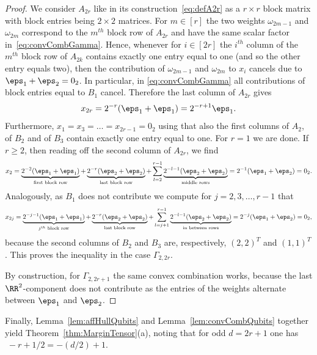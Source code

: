 \begin{proof}
We consider $A_{2r}$ like in its construction~\eqref{eq:defA2r} as a $r \times r$ block matrix with block entries being $2 \times 2$ matrices. For $m \in [r]$ the two weights $\omega_{2m-1}$ and $\omega_{2m}$ correspond to the $m^{th}$ block row of $A_{2r}$ and have the same scalar factor in~\eqref{eq:convCombGamma}. Hence, whenever for $i \in [2r]$ the $i^{th}$ column of the $m^{th}$ block row of $A_{2k}$ contains exactly one entry equal to one (and so the other entry equals two), then the contribution of $\omega_{2m-1}$ and $\omega_{2m}$ to $x_i$ cancels due to $\eps_1 + \eps_2 = 0_2$.
In particular, in \eqref{eq:convCombGamma} all contributions of block entries equal to $B_1$ cancel. Therefore the last column of $A_{2r}$ gives
	\begin{align*}
	x_{2r} = 2^{-r} (\eps_1 + \eps_1) = 2^{-r+1} \eps_1.
	\end{align*}
Furthermore, $x_1 = x_{3} = \ldots = x_{2r-1} = 0_2$ using that also the first columns of $A_2$, of $B_2$ and of $B_3$ contain exactly one entry equal to one. For $r=1$ we are done.
If $r \geq 2$, then reading off the second column of $A_{2r}$, we find 
	\begin{align*}
	x_2 = \underbrace{2^{-2} (\eps_1 + \eps_1)}_{\text{first block row}} + \underbrace{2^{-r} (\eps_2 + \eps_2)}_{\text{last block row}} + \sum_{l=2}^{r-1} \underbrace{ 2^{-l-1} (\eps_2 + \eps_2)}_{\text{middle rows}} = 2^{-1} (\eps_1 + \eps_2) = 0_2.
	\end{align*}
Analogously, as $B_1$ does not contribute we compute for $j = 2,3,\ldots,r-1$ that
	\begin{align*}
	x_{2j} = \underbrace{2^{-j-1} (\eps_1 + \eps_1)}_{j^{th} \text{ block row}} + \underbrace{2^{-r} (\eps_2 + \eps_2)}_{\text{last block row}} + \sum_{l=j+1}^{r-1} \underbrace{ 2^{-l-1} (\eps_2 + \eps_2)}_{\text{in between rows}} = 2^{-j} (\eps_1 + \eps_2) = 0_2,
	\end{align*}
because the second columns of $B_2$ and $B_3$ are, respectively, $(2,2)^T$ and $(1,1)^T$. This proves the inequality in the case $\Gamma_{2,2r}$.

By construction, for $\Gamma_{2,2r+1}$ the same convex combination works, because the last $\RR^2$-component does not contribute as the entries of the weights alternate between $\eps_1$ and $\eps_2$.
\end{proof}

Finally, Lemma~\ref{lem:affHullQubits} and Lemma~\ref{lem:convCombQubits} together yield Theorem~\ref{thm:MarginTensor}(a), noting that for odd $d=2r+1$ one has $\; -r + 1/2 = -(d/2) + 1$.

